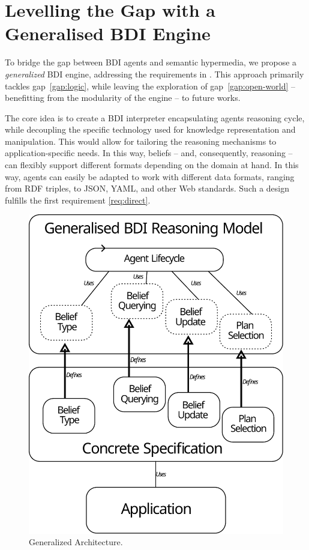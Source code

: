 \documentclass[
]{ceurart}
\begin{document}
\section{Levelling the Gap with a Generalised \ac{BDI} Engine}
\label{sec:generalized-bdi-engine}

To bridge the gap between \ac{BDI} agents and semantic hypermedia,
we propose a \emph{generalized} \ac{BDI} engine,
addressing the requirements in .
%
This approach primarily tackles gap~\ref{gap:logic}, while leaving the exploration of gap~\ref{gap:open-world} -- benefitting from the modularity of the engine -- to future works.

The core idea is to create a \ac{BDI} interpreter encapsulating agents reasoning cycle,
while decoupling the specific technology used for knowledge representation and manipulation.
%
This would allow for tailoring the reasoning mechanisms to application-specific needs.
%
In this way,
beliefs
-- and, consequently, reasoning --
can flexibly support different formats depending on the domain at hand.
%
In this way,
agents can easily be adapted to work with different data formats,
ranging from \ac{RDF} triples, to JSON, YAML, and other Web standards.
%
Such a design fulfills the first requirement \ref{req:direct}.

\begin{figure}
    \centering
    \caption{Generalized Architecture.}
    \label{fig:generalized-bdi-architecture}
    \includegraphics[width=\linewidth]{figures/architecture.pdf}
\end{figure}
\end{document}
